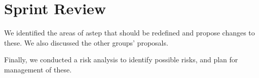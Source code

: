 \section{Sprint Review} \label{sprint_1_review}
We identified the areas of \gls{astep} that should be redefined and propose changes to these. We also discussed the other groups' proposals.

Finally, we conducted a risk analysis to identify possible risks, and plan for management of these.
\noindent
\newline
